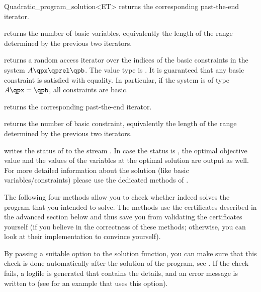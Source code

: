 \begin{ccRefClass}{Quadratic_program_solution<ET>}
{returns the corresponding past-the-end iterator.}

{returns the number of basic variables, equivalently the length
of the range determined by the previous two iterators.}

\ccExample
{}

{returns a random access iterator over the indices of the basic
constraints in the system $A\qpx\qprel \qpb$. The value type is . 
It is guaranteed that any basic constraint is satisfied with equality.
In particular, if the system is of type $A\qpx=\qpb$, all constraints are
basic.}

{returns the corresponding past-the-end iterator.}

{returns the number of basic constraint, equivalently the length
of the range determined by the previous two iterators.}

\ccExample
{}


{writes the status of  to the stream . In case the
status is , the optimal objective value and the values
of the variables at the optimal solution are output as well. For more
detailed information about the solution (like basic variables/constraints) 
please use the dedicated methods of .}

The following four methods allow you to check whether  indeed
solves the program that you intended to solve. The methods 
use the certificates described in the advanced section below and
thus save you from validating the certificates yourself (if you believe 
in the correctness of these methods; otherwise, you can look at their
implementation to convince yourself). 

By passing a suitable option to the solution function, you can make sure that 
this check is done automatically after the solution of the program, see 
. If the check fails, a logfile is generated
that contains the details, and an error message is written to 
(see  for an example that uses
this option).


\end{ccRefClass}

